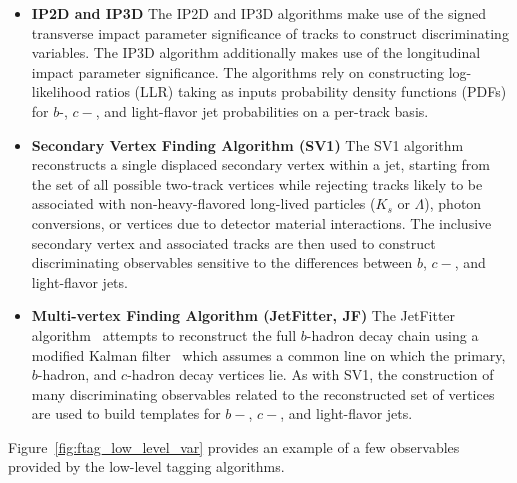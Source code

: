 \begin{itemize}
    \item{\textbf{IP2D and IP3D}} The IP2D and IP3D algorithms make use of the signed transverse impact parameter significance of tracks
        to construct discriminating variables. The IP3D algorithm additionally makes use of the longitudinal impact parameter
        significance. The algorithms rely on constructing log-likelihood ratios (LLR) taking as inputs probability density functions (PDFs)
        for $b$-, $c-$, and light-flavor jet probabilities on a per-track basis.
    \item{\textbf{Secondary Vertex Finding Algorithm (SV1)}} The SV1 algorithm~\cite{SV1} reconstructs a single displaced secondary vertex within
        a jet, starting from the set of all possible two-track vertices while rejecting tracks likely to be associated with
        non-heavy-flavored long-lived particles ($K_s$ or $\Lambda$), photon conversions, or vertices due to detector material interactions.
        The inclusive secondary vertex and associated tracks are then used to construct discriminating observables sensitive to the differences
        between $b$, $c-$, and light-flavor jets.
    \item{\textbf{Multi-vertex Finding Algorithm (JetFitter, JF)}} The JetFitter algorithm~\cite{JETFITTER} attempts to reconstruct the full
        $b$-hadron decay chain using a modified Kalman filter~\cite{KalmanFilter} which assumes a common line on which the primary, $b$-hadron,
        and $c$-hadron decay vertices lie. As with SV1, the construction of many discriminating observables related to the
        reconstructed set of vertices are used to build templates for $b-$, $c-$, and light-flavor jets.
\end{itemize}

Figure~\ref{fig:ftag_low_level_var} provides an example of a few observables provided by the low-level tagging algorithms.

